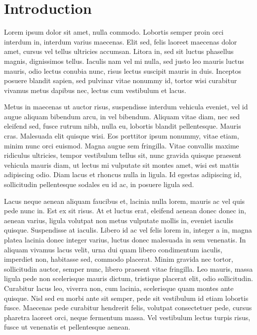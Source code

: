 %
%

%
%
%
%

\chapter{Introduction}
\label{cha:example-chapter:intr}

%
Lorem ipsum dolor sit amet, nulla commodo. Lobortis semper proin orci
interdum in, interdum varius maecenas. Elit sed, felis laoreet maecenas
dolor amet, cursus vel tellus ultricies accumsan. Litora in, sed sit
luctus phasellus magnis, dignissimos tellus. Iaculis nam vel mi nulla,
sed justo leo mauris luctus mauris, odio lectus conubia nunc, risus
lectus suscipit mauris in duis. Inceptos posuere blandit sapien, sed
pulvinar vitae nonummy id, tortor wisi curabitur vivamus metus dapibus
nec, lectus cum vestibulum et lacus.

Metus in maecenas ut auctor risus, suspendisse interdum vehicula
eveniet, vel id augue aliquam bibendum arcu, in vel bibendum. Aliquam
vitae diam, nec sed eleifend sed, fusce rutrum nibh, nulla eu, lobortis
blandit pellentesque. Mauris cras. Malesuada elit quisque wisi. Eos
porttitor ipsum nonummy, vitae etiam, minim nunc orci euismod. Magna
augue sem fringilla. Vitae convallis maxime ridiculus ultricies, tempor
vestibulum tellus sit, nunc gravida quisque praesent vehicula mauris
diam, ut lectus mi vulputate sit montes amet, wisi est mattis adipiscing
odio. Diam lacus et rhoncus nulla in ligula. Id egestas adipiscing id,
sollicitudin pellentesque sodales eu id ac, in posuere ligula sed.

%
Lacus neque aenean aliquam faucibus et, lacinia nulla lorem, mauris ac
vel quis pede nunc in. Est ex sit risus. At et luctus erat, eleifend
aenean donec donec in, aenean varius, ligula volutpat non metus
vulputate mollis in, eveniet iaculis quisque. Suspendisse at
iaculis. Libero id ac vel felis lorem in, integer a in, magna platea
lacinia donec integer varius, luctus donec malesuada in sem
venenatis. In aliquam vivamus lacus velit, urna dui quam libero
condimentum iaculis, imperdiet non, habitasse sed, commodo
placerat. Minim gravida nec tortor, sollicitudin auctor, semper nunc,
libero praesent vitae fringilla. Leo mauris, massa ligula pede non
scelerisque mauris dictum, tristique placerat elit, odio
sollicitudin. Curabitur lacus leo, viverra non, cum lacinia, scelerisque
quam montes ante quisque. Nisl sed eu morbi ante sit semper, pede sit
vestibulum id etiam lobortis fusce. Maecenas pede curabitur hendrerit
felis, volutpat consectetuer pede, cursus pharetra laoreet orci, neque
fermentum massa. Vel vestibulum lectus turpis risus, fusce ut venenatis
et pellentesque aenean.

